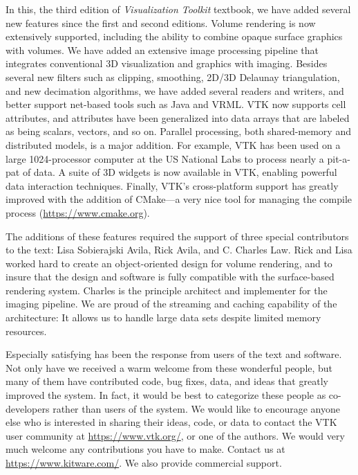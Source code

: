 In this, the third edition of \textit{Visualization Toolkit} textbook, we have added several new features since the first and second editions. Volume rendering is now extensively supported, including the ability to combine opaque surface graphics with volumes. We have added an extensive image processing pipeline that integrates conventional 3D visualization and graphics with imaging. Besides several new filters such as clipping, smoothing, 2D/3D Delaunay triangulation, and new decimation algorithms, we have added several readers and writers, and better support net-based tools such as Java and VRML. VTK now supports cell attributes, and attributes have been generalized into data arrays that are labeled as being scalars, vectors, and so on. Parallel processing, both shared-memory and distributed models, is a major addition. For example, VTK has been used on a large 1024-processor computer at the US National Labs to process nearly a pit-a-pat of data. A suite of 3D widgets is now available in VTK, enabling powerful data interaction techniques. Finally, VTK's cross-platform support has greatly improved with the addition of CMake---a very nice tool for managing the compile process (\href{https://www.cmake.org}{https://www.cmake.org}).

The additions of these features required the support of three special contributors to the text: Lisa Sobierajski Avila, Rick Avila, and C. Charles Law. Rick and Lisa worked hard to create an object-oriented design for volume rendering, and to insure that the design and software is fully compatible with the surface-based rendering system. Charles is the principle architect and implementer for the imaging pipeline. We are proud of the streaming and caching capability of the architecture: It allows us to handle large data sets despite limited memory resources.

Especially satisfying has been the response from users of the text and software. Not only have we received a warm welcome from these wonderful people, but many of them have contributed code, bug fixes, data, and ideas that greatly improved the system. In fact, it would be best to categorize these people as co-developers rather than users of the system. We would like to encourage anyone else who is interested in sharing their ideas, code, or data to contact the VTK user community at \href{https://www.vtk.org/}{https://www.vtk.org/}, or one of the authors. We would very much welcome any contributions you have to make. Contact us at \href{https://www.kitware.com/}{https://www.kitware.com/}. We also provide commercial support.

